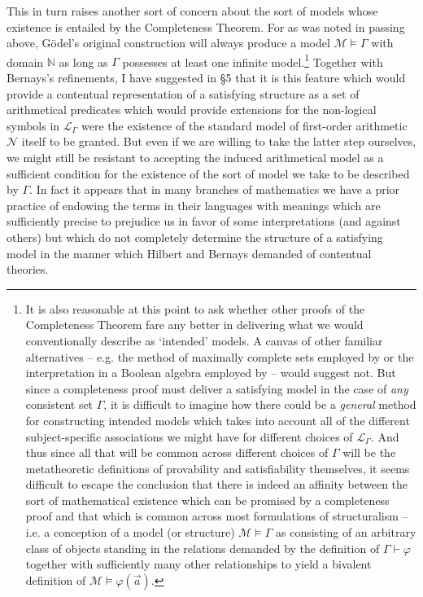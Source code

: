 \documentclass[11pt,fleqn,leqno]{article}
\def\phi{\varphi}
\def\proves{\vdash}
\begin{document}
This in turn raises another sort of concern about the sort of models whose existence is entailed by the Completeness Theorem.   For as was noted in passing above, G\"odel's original construction will always produce a model $\mathcal{M} \models \Gamma$ with domain $\mathbb{N}$ as long as $\Gamma$ possesses at least one infinite model.\footnote{It is also reasonable at this point to ask whether other  proofs of the Completeness Theorem fare any better in delivering what we would conventionally describe as `intended' models.   A canvas of other familiar alternatives -- e.g. the method of maximally complete sets employed by \citet{Henkin1949} or the interpretation in a Boolean algebra employed by \citet{Rasiowa1953} -- would suggest not.  But since a completeness proof must deliver a satisfying model in the case of \textsl{any} consistent set $\Gamma$, it is difficult to imagine how there could be a \textsl{general} method for constructing intended models which takes into account all of the different subject-specific associations we might have for different choices of $\mathcal{L}_{\Gamma}$.   And thus since all that will be common across different choices of $\Gamma$ will be the metatheoretic definitions of provability and satisfiability themselves, it seems difficult to escape the conclusion that there is indeed an affinity between the sort of mathematical existence which can be promised by a completeness proof and that which is common across most formulations of structuralism -- i.e. a conception of a model (or structure) $\mathcal{M} \models \Gamma$ as consisting of an arbitrary class of objects standing in the relations demanded by the definition of $\Gamma \proves \phi$ together with sufficiently many other relationships to yield a bivalent definition of $\mathcal{M} \models \phi(\vec{a})$.}  Together with Bernays's refinements, I have suggested in \S 5 that it is this feature which would provide a contentual representation of a satisfying structure as a set of  arithmetical predicates which would provide extensions for the non-logical symbols in $\mathcal{L}_{\Gamma}$ were the existence of the standard model of first-order arithmetic $\mathcal{N}$ itself to be granted.  But even if we are willing to take the latter step ourselves, we might still be resistant to accepting the induced arithmetical model as a sufficient condition for the existence of the sort of model we take to be described by $\Gamma$.   In fact it appears that in many branches of mathematics we have a prior practice of endowing the terms in their languages with meanings which are sufficiently precise to prejudice us in favor of some interpretations (and against others) but which do not  completely determine the structure of a satisfying model in the manner which Hilbert and Bernays demanded of contentual theories.
\end{document}
